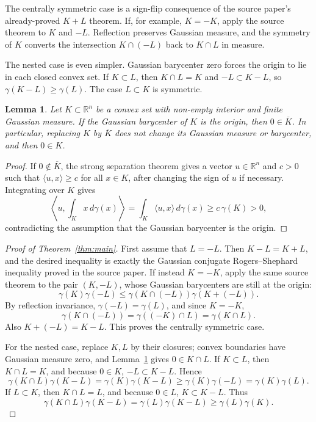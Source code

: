 \documentclass[11pt]{article}
\newtheorem{lemma}{Lemma}
\newcommand{\R}{\mathbb R}
\newcommand{\gauss}{\gamma}
\begin{document}
The centrally symmetric case is a sign-flip consequence of the source
paper's already-proved \(K+L\) theorem.  If, for example, \(K=-K\), apply the
source theorem to \(K\) and \(-L\).  Reflection preserves Gaussian measure,
and the symmetry of \(K\) converts the intersection \(K\cap(-L)\) back to
\(K\cap L\) in measure.

The nested case is even simpler.  Gaussian barycenter zero forces the origin
to lie in each closed convex set.  If \(K\subset L\), then \(K\cap L=K\) and
\(-L\subset K-L\), so \(\gauss(K-L)\geq\gauss(L)\).  The case \(L\subset K\)
is symmetric.

\begin{lemma}\label{lem:origin}
Let \(K\subset \R^n\) be a convex set with non-empty interior and finite
Gaussian measure.  If the Gaussian barycenter of \(K\) is the origin, then
\(0\in \overline K\).  In particular, replacing \(K\) by \(\overline K\) does
not change its Gaussian measure or barycenter, and then \(0\in K\).
\end{lemma}

\begin{proof}
If \(0\notin \overline K\), the strong separation theorem gives a vector
\(u\in \R^n\) and \(c>0\) such that \(\langle u,x\rangle\geq c\) for all
\(x\in K\), after changing the sign of \(u\) if necessary.  Integrating over
\(K\) gives
\[
  \left\langle u,\int_K x\,d\gauss(x)\right\rangle
  =\int_K \langle u,x\rangle\,d\gauss(x)
  \geq c\,\gauss(K)>0,
\]
contradicting the assumption that the Gaussian barycenter is the origin.
\end{proof}

\begin{proof}[Proof of Theorem~\ref{thm:main}]
First assume that \(L=-L\).  Then \(K-L=K+L\), and the desired inequality is
exactly the Gaussian conjugate Rogers--Shephard inequality proved in the
source paper.  If instead \(K=-K\), apply the same source theorem to the pair
\((K,-L)\), whose Gaussian barycenters are still at the origin:
\[
  \gauss(K)\gauss(-L)\leq \gauss(K\cap(-L))\gauss(K+(-L)).
\]
By reflection invariance, \(\gauss(-L)=\gauss(L)\), and since \(K=-K\),
\[
  \gauss(K\cap(-L))=\gauss((-K)\cap L)=\gauss(K\cap L).
\]
Also \(K+(-L)=K-L\).  This proves the centrally symmetric case.

For the nested case, replace \(K,L\) by their closures; convex boundaries have
Gaussian measure zero, and Lemma~\ref{lem:origin} gives \(0\in K\cap L\).
If \(K\subset L\), then \(K\cap L=K\), and because \(0\in K\),
\(-L\subset K-L\).  Hence
\[
  \gauss(K\cap L)\gauss(K-L)
  =\gauss(K)\gauss(K-L)
  \geq \gauss(K)\gauss(-L)
  =\gauss(K)\gauss(L).
\]
If \(L\subset K\), then \(K\cap L=L\), and because \(0\in L\), \(K\subset
K-L\).  Thus
\[
  \gauss(K\cap L)\gauss(K-L)
  =\gauss(L)\gauss(K-L)
  \geq \gauss(L)\gauss(K).
\]
\end{proof}
\end{document}

